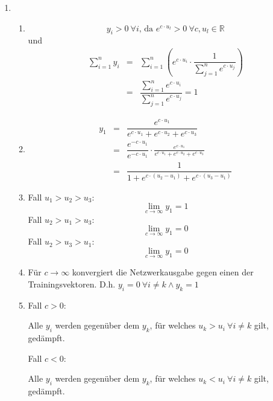 \documentclass[DIN, pagenumber=false, fontsize=11pt, parskip=half]{scrartcl}
\begin{document}
	\begin{enumerate}
		\item
			\begin{enumerate}[label=(\alph*)]
				\item
					\begin{equation*}
							y_i > 0 \ \forall i \text{, da } e^{c\cdot u_l} > 0 \ \forall c, u_l \in \mathbb{R}
					\end{equation*}
					und 
					\begin{eqnarray*}
							\sum_{i=1}^{n}{y_i} &=& \sum_{i=1}^{n}{\left( e^{c\cdot u_i} \cdot \dfrac{1}{\sum_{j=1}^{n}{e^{c\cdot u_j}}} \right)} \\
							&=& \dfrac{\sum_{i=1}^{n}{e^{c\cdot u_i}}} {\sum_{j=1}^{n}{e^{c\cdot u_j}}} = 1
					\end{eqnarray*}
				\item
					\begin{eqnarray*}
							y_1 &=& \dfrac{e^{c \cdot u_1}}{e^{c \cdot u_1} + e^{c \cdot u_2} + e^{c \cdot u_3}} \\
							&=& \dfrac{e^{-c \cdot u_1}}{e^{-c \cdot u_1}} \cdot \frac{e^{c \cdot u_1}}{e^{c \cdot u_1} + e^{c \cdot u_2} + e^{c \cdot u_3}} \\
							&=& \dfrac{1}{1 + e^{c \cdot (u_2 - u_1)} + e^{c \cdot (u_3 - u_1)}}
					\end{eqnarray*}
				\item
					Fall $u_1 > u_2 > u_3$:
					\begin{equation*}
							\lim_{c\rightarrow \infty}y_1 = 1
					\end{equation*}
					Fall $u_2 > u_1 > u_3$:
					\begin{equation*}
							\lim_{c\rightarrow \infty}y_1 = 0
					\end{equation*}
					Fall $u_2 > u_3 > u_1$:
					\begin{equation*}
							\lim_{c\rightarrow \infty}y_1 = 0
					\end{equation*}
				\item
					Für $c \rightarrow \infty$ konvergiert die Netzwerkausgabe gegen einen der Trainingsvektoren. D.h. $y_i = 0 \  \forall i \neq k \wedge y_k = 1$
				\item
					Fall $c>0$: 

					Alle $y_i$ werden gegenüber dem $y_k$, für welches $u_k > u_i \ \forall i\neq k$ gilt, gedämpft.

					Fall $c < 0$:

					Alle $y_i$ werden gegenüber dem $y_k$, für welches $u_k < u_i \ \forall i\neq k$ gilt, gedämpft.


\end{enumerate}
\end{enumerate}
\end{document}
